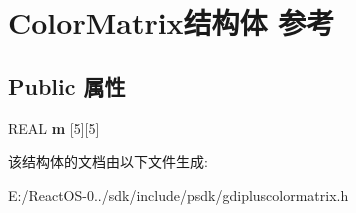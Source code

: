 \hypertarget{struct_color_matrix}{}\section{Color\+Matrix结构体 参考}
\label{struct_color_matrix}
\subsection*{Public 属性}
\begin{DoxyCompactItemize}
\item 
\mbox{\label{struct_color_matrix_ac7e5bf9723e36691ffef9d660a38a94d}} 
R\+E\+AL {\bfseries m} \mbox{[}5\mbox{]}\mbox{[}5\mbox{]}
\end{DoxyCompactItemize}


该结构体的文档由以下文件生成\+:\begin{DoxyCompactItemize}
\item 
E\+:/\+React\+O\+S-\/0../sdk/include/psdk/gdipluscolormatrix.\+h\end{DoxyCompactItemize}
